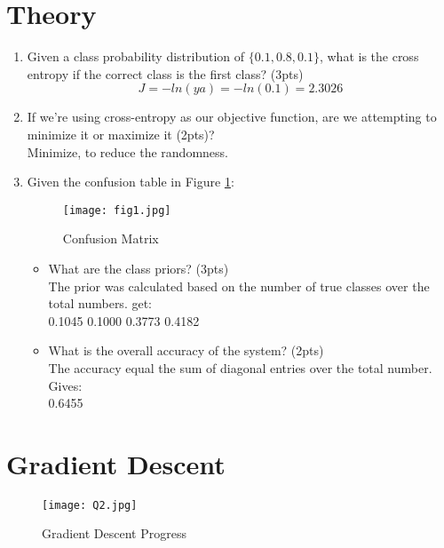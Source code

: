 \documentclass[12pt]{article}
\begin{document}
\maketitle



\newpage
\section{Theory}
\begin{enumerate}
\item Given a class probability distribution of $\{0.1,0.8, 0.1\}$, what is the cross entropy if the correct class is the first class?  (3pts)
$$ J = -ln(ya)=-ln(0.1)=2.3026$$
\item If we're using cross-entropy as our objective function, are we attempting to minimize it or maximize it (2pts)?\\
Minimize, to reduce the randomness.
\item Given the confusion table in Figure \ref{confusion}:
\begin{figure}[H]
\begin{center}
\texttt{[image: fig1.jpg]}
\caption{Confusion Matrix}
\label{confusion}
\end{center}
\end{figure}
\begin{itemize}
\item What are the class priors? (3pts)\\
The prior was calculated based on the number of true classes over the total numbers. get:\\
    0.1045    0.1000    0.3773    0.4182

\item What is the overall accuracy of the system? (2pts)\\
The accuracy equal the sum of diagonal entries over the total number. Gives: \\
0.6455
\end{itemize}
\end{enumerate}

\newpage
\section{Gradient Descent}
  
\begin{figure}[H]
\begin{center}
\texttt{[image: Q2.jpg]}
\caption{Gradient Descent Progress}
\end{center}
\end{figure}
\end{document}

